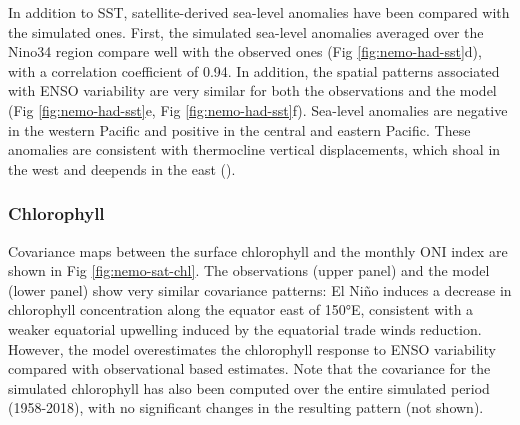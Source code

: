In addition to SST, satellite-derived sea-level anomalies have been compared with the simulated ones. First, the simulated sea-level anomalies averaged over the Nino34 region compare well with the observed ones (Fig \ref{fig:nemo-had-sst}d), with a correlation coefficient of 0.94. In addition, the spatial patterns associated with ENSO variability are very similar for both the observations and the model (Fig \ref{fig:nemo-had-sst}e, Fig \ref{fig:nemo-had-sst}f). Sea-level anomalies are negative in the western Pacific and positive in the central and eastern Pacific. These anomalies are consistent with thermocline vertical displacements, which shoal in the west and deepends in the east ().

\subsubsection{Chlorophyll}

Covariance maps between the surface chlorophyll and the monthly ONI index are shown in Fig \ref{fig:nemo-sat-chl}. The observations (upper panel) and the model (lower panel) show very similar covariance patterns: El Niño induces a decrease in chlorophyll concentration along the equator east of 150°E, consistent with a weaker equatorial upwelling induced by the equatorial trade winds reduction. However, the model overestimates the chlorophyll response to ENSO variability compared with observational based estimates. Note that the covariance for the simulated chlorophyll has also been computed over the entire simulated period (1958-2018), with no significant changes in the resulting pattern (not shown).

